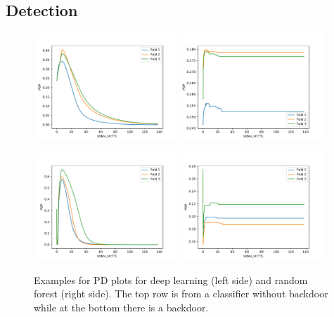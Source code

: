 \documentclass[10pt,sigconf,letterpaper,dvipsnames]{acmart}
\begin{document}
\subsection{Detection}

\begin{figure}[h]

\includegraphics[width=0.48\textwidth]{../pdp_CAIA_backdoor_17/apply(stdev(ipTTL),forward)_nn.pdf}
\includegraphics[width=0.48\textwidth]{../pdp_CAIA_backdoor_17/apply(stdev(ipTTL),forward)_rf.pdf}

\includegraphics[width=0.48\textwidth]{../pdp_CAIA_backdoor_17/apply(stdev(ipTTL),forward)_nn_bd.pdf}
\includegraphics[width=0.48\textwidth]{../pdp_CAIA_backdoor_17/apply(stdev(ipTTL),forward)_rf_bd.pdf}

\caption{Examples for PD plots for deep learning (left side) and random forest (right side). The top row is from a classifier without backdoor while at the bottom there is a backdoor.}
\label{fig:pdp_backdoor}
\end{figure}
\end{document}
